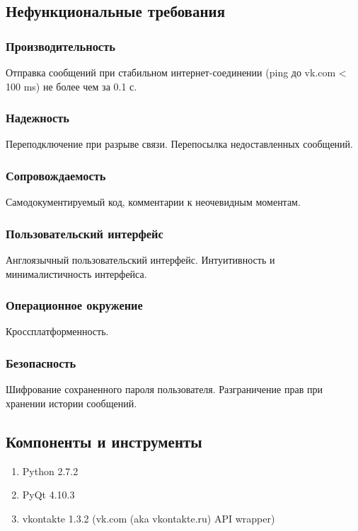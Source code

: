 \documentclass[12pt]{article}
\begin{document}
\subsection*{Нефункциональные требования}

\subsubsection*{Производительность}
Отправка сообщений при стабильном интернет-соединении (ping до vk.com < 100 ms) не более чем за 0.1 с.

\subsubsection*{Надежность}
Переподключение при разрыве связи. Перепосылка недоставленных сообщений.

\subsubsection*{Сопровождаемость}
Самодокументируемый код, комментарии к неочевидным моментам.


\subsubsection*{Пользовательский интерфейс}
Англоязычный пользовательский интерфейс. Интуитивность и минималистичность интерфейса.

\subsubsection*{Операционное окружение}
Кроссплатформенность.

\subsubsection*{Безопасность}
Шифрование сохраненного пароля пользователя.
Разграничение прав при хранении истории сообщений.

\subsection*{Компоненты и инструменты}
% 
\begin{enumerate}
\item Python 2.7.2
\item PyQt 4.10.3
\item vkontakte 1.3.2 (vk.com (aka vkontakte.ru) API wrapper)
\end{enumerate}
\end{document}
